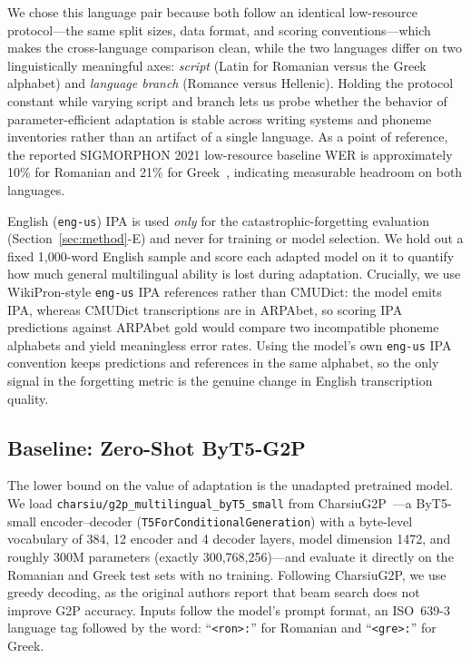 \documentclass[conference]{IEEEtran}
\begin{document}
We chose this language pair because both follow an identical low-resource protocol---the same split sizes, data format, and scoring conventions---which makes the cross-language comparison clean, while the two languages differ on two linguistically meaningful axes: \emph{script} (Latin for Romanian versus the Greek alphabet) and \emph{language branch} (Romance versus Hellenic). Holding the protocol constant while varying script and branch lets us probe whether the behavior of parameter-efficient adaptation is stable across writing systems and phoneme inventories rather than an artifact of a single language. As a point of reference, the reported SIGMORPHON 2021 low-resource baseline WER is approximately 10\% for Romanian and 21\% for Greek~\cite{ashby2021}, indicating measurable headroom on both languages.

English (\texttt{eng-us}) IPA is used \emph{only} for the catastrophic-forgetting evaluation (Section~\ref{sec:method}-E) and never for training or model selection. We hold out a fixed 1{,}000-word English sample and score each adapted model on it to quantify how much general multilingual ability is lost during adaptation. Crucially, we use WikiPron-style \texttt{eng-us} IPA references rather than CMUDict: the model emits IPA, whereas CMUDict transcriptions are in ARPAbet, so scoring IPA predictions against ARPAbet gold would compare two incompatible phoneme alphabets and yield meaningless error rates. Using the model's own \texttt{eng-us} IPA convention keeps predictions and references in the same alphabet, so the only signal in the forgetting metric is the genuine change in English transcription quality.

\subsection{Baseline: Zero-Shot ByT5-G2P}

The lower bound on the value of adaptation is the unadapted pretrained model. We load \texttt{charsiu/g2p\_multilingual\_byT5\_small} from CharsiuG2P~\cite{zhu2022}---a ByT5-small encoder--decoder (\texttt{T5ForConditionalGeneration}) with a byte-level vocabulary of 384, 12 encoder and 4 decoder layers, model dimension 1472, and roughly 300M parameters (exactly 300{,}768{,}256)---and evaluate it directly on the Romanian and Greek test sets with no training. Following CharsiuG2P, we use greedy decoding, as the original authors report that beam search does not improve G2P accuracy. Inputs follow the model's prompt format, an ISO~639-3 language tag followed by the word: ``\texttt{<ron>:}'' for Romanian and ``\texttt{<gre>:}'' for Greek.
\end{document}
